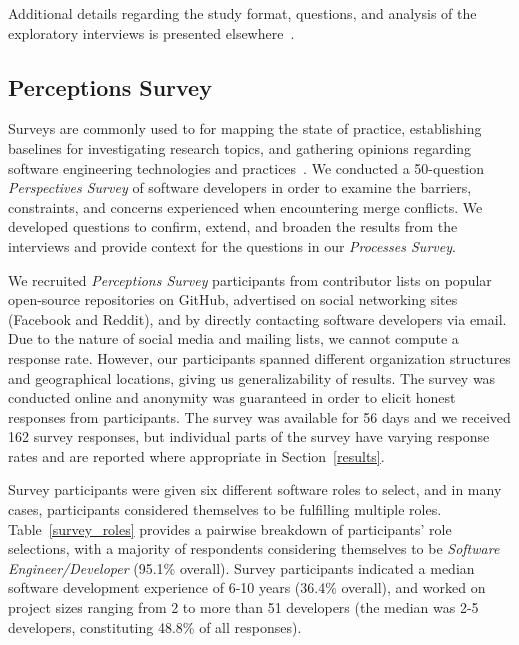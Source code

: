 Additional details regarding the study format, questions, and analysis of the exploratory interviews is presented elsewhere~\cite{mckee2017software}.

\subsection{Perceptions Survey}\label{perceptions_survey}

Surveys are commonly used to for mapping the state of practice, establishing baselines for investigating research topics, and gathering opinions regarding software engineering technologies and practices~\cite{deMello2016survey}.
We conducted a 50-question \textit{Perspectives Survey} of software developers in order to examine the barriers, constraints, and concerns experienced when encountering merge conflicts.
We developed questions to confirm, extend, and broaden the results from the interviews and provide context for the questions in our \textit{Processes Survey}.

\renewcommand*{\thefootnote}{\arabic{footnote}}
\setcounter{footnote}{0}
We recruited \textit{Perceptions Survey} participants from contributor lists on popular open-source repositories on GitHub, advertised on social networking sites (Facebook and Reddit), and by directly contacting software developers via email. 
Due to the nature of social media and mailing lists, we cannot compute a response rate. 
However, our participants spanned different organization structures and geographical locations, giving us generalizability of results.
The survey was conducted online and anonymity was guaranteed in order to elicit honest responses from participants.
The survey was available for 56 days and we received 162 survey responses, but individual parts of the survey have varying response rates and are reported where appropriate in Section~\ref{results}. 

Survey participants were given six different software roles to select, and in many cases, participants considered themselves to be fulfilling multiple roles. 
Table~\ref{survey_roles} provides a pairwise breakdown of participants' role selections, with a majority of respondents considering themselves to be \textit{Software Engineer/Developer} (95.1\% overall).
Survey participants indicated a median software development experience of 6-10 years (36.4\% overall), and worked on project sizes ranging from 2 to more than 51 developers (the median was 2-5 developers, constituting 48.8\% of all responses).

